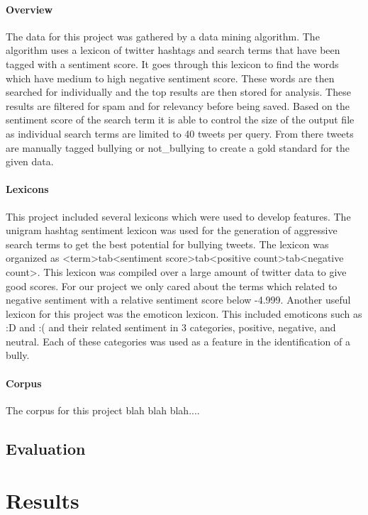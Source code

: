 \documentclass[11pt,letterpaper]{article}
\begin{document}
\paragraph{Overview}
The data for this project was gathered by a data mining algorithm. The algorithm uses a lexicon of twitter hashtags and search terms that have been tagged with a sentiment score. It goes through this lexicon to find the words which have medium to high negative sentiment score. These words are then searched for individually and the top results are then stored for analysis. These results are filtered for spam and for relevancy before being saved. Based on the sentiment score of the search term it is able to control the size of the output file as individual search terms are limited to 40 tweets per query. From there tweets are manually tagged bullying or not\_bullying to create a gold standard for the given data.
\paragraph{Lexicons}
This project included several lexicons which were used to develop features. The unigram hashtag sentiment lexicon was used for the generation of aggressive search terms to get the best potential for bullying tweets. The lexicon was organized as <term>tab<sentiment score>tab<positive count>tab<negative count>. This lexicon was compiled over a large amount of twitter data to give good scores. For our project we only cared about the terms which related to negative sentiment with a relative sentiment score below -4.999.
 Another useful lexicon for this project was the emoticon lexicon. This included emoticons such as :D and :( and their related sentiment in 3 categories, positive, negative, and neutral. Each of these categories was used as a feature in the identification of a bully.
\paragraph{Corpus}
The corpus for this project blah blah blah....


\subsection{Evaluation}

\section{Results}
\end{document}
